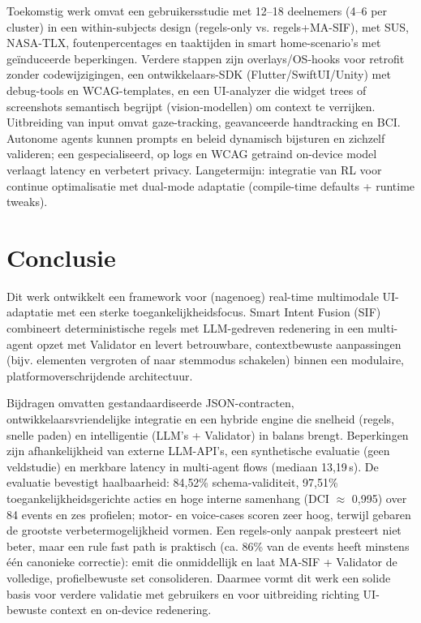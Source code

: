 \documentclass[openany]{book}
\begin{document}
Toekomstig werk omvat een gebruikersstudie met 12–18 deelnemers (4–6 per cluster) in een within-subjects design (regels-only vs. regels+MA-SIF), met SUS, NASA-TLX, foutenpercentages en taaktijden in smart home-scenario’s met geïnduceerde beperkingen. Verdere stappen zijn overlays/OS-hooks voor retrofit zonder codewijzigingen, een ontwikkelaars-SDK (Flutter/SwiftUI/Unity) met debug-tools en WCAG-templates, en een UI-analyzer die widget trees of screenshots semantisch begrijpt (vision-modellen) om context te verrijken. Uitbreiding van input omvat gaze-tracking, geavanceerde handtracking en BCI. Autonome agents kunnen prompts en beleid dynamisch bijsturen en zichzelf valideren; een gespecialiseerd, op logs en WCAG getraind on-device model verlaagt latency en verbetert privacy. Langetermijn: integratie van RL voor continue optimalisatie met dual-mode adaptatie (compile-time defaults + runtime tweaks).

\section*{Conclusie}
Dit werk ontwikkelt een framework voor (nagenoeg) real-time multimodale UI-adaptatie met een sterke toegankelijkheidsfocus. Smart Intent Fusion (SIF) combineert deterministische regels met LLM-gedreven redenering in een multi-agent opzet met Validator en levert betrouwbare, contextbewuste aanpassingen (bijv. elementen vergroten of naar stemmodus schakelen) binnen een modulaire, platformoverschrijdende architectuur.

Bijdragen omvatten gestandaardiseerde JSON-contracten, ontwikkelaarsvriendelijke integratie en een hybride engine die snelheid (regels, snelle paden) en intelligentie (LLM’s + Validator) in balans brengt. Beperkingen zijn afhankelijkheid van externe LLM-API’s, een synthetische evaluatie (geen veldstudie) en merkbare latency in multi-agent flows (mediaan 13{,}19\,s). De evaluatie bevestigt haalbaarheid: 84{,}52\% schema-validiteit, 97{,}51\% toegankelijkheidsgerichte acties en hoge interne samenhang (DCI $\approx$ 0{,}995) over 84 events en zes profielen; motor- en voice-cases scoren zeer hoog, terwijl gebaren de grootste verbetermogelijkheid vormen. Een regels-only aanpak presteert niet beter, maar een rule fast path is praktisch (ca. 86\% van de events heeft minstens één canonieke correctie): emit die onmiddellijk en laat MA-SIF + Validator de volledige, profielbewuste set consolideren. Daarmee vormt dit werk een solide basis voor verdere validatie met gebruikers en voor uitbreiding richting UI-bewuste context en on-device redenering.


\tableofcontents
\listoffigures
\listoftables

















\printbibliography[title=References]
\end{document}
